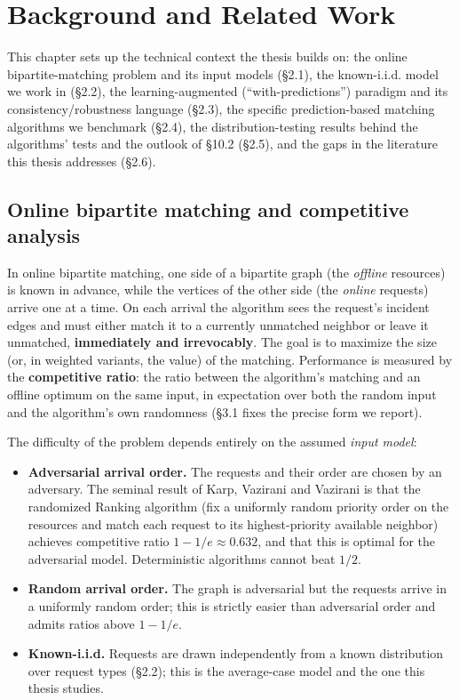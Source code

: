 \chapter{Background and Related Work}

This chapter sets up the technical context the thesis builds on: the
online bipartite-matching problem and its input models (§2.1), the
known-i.i.d. model we work in (§2.2), the learning-augmented
(``with-predictions'') paradigm and its consistency/robustness language
(§2.3), the specific prediction-based matching algorithms we benchmark
(§2.4), the distribution-testing results behind the algorithms' tests
and the outlook of §10.2 (§2.5), and the gaps in the literature this
thesis addresses (§2.6).

\section{Online bipartite matching and competitive
analysis}

In online bipartite matching, one side of a bipartite graph (the
\emph{offline} resources) is known in advance, while the vertices of the
other side (the \emph{online} requests) arrive one at a time. On each
arrival the algorithm sees the request's incident edges and must either
match it to a currently unmatched neighbor or leave it unmatched,
\textbf{immediately and irrevocably}. The goal is to maximize the size
(or, in weighted variants, the value) of the matching. Performance is
measured by the \textbf{competitive ratio}: the ratio between the
algorithm's matching and an offline optimum on the same input, in
expectation over both the random input and the algorithm's own
randomness (§3.1 fixes the precise form we report).

The difficulty of the problem depends entirely on the assumed
\emph{input model}:

\begin{itemize}
\tightlist
\item
  \textbf{Adversarial arrival order.} The requests and their order are
  chosen by an adversary. The seminal result of Karp, Vazirani and
  Vazirani \autocite{kvv1990ranking} is that the randomized Ranking
  algorithm (fix a uniformly random priority order on the resources and
  match each request to its highest-priority available neighbor)
  achieves competitive ratio \(1-1/e\approx0.632\), and that this is
  optimal for the adversarial model. Deterministic algorithms cannot
  beat \(1/2\).
\item
  \textbf{Random arrival order.} The graph is adversarial but the
  requests arrive in a uniformly random order; this is strictly easier
  than adversarial order and admits ratios above \(1-1/e\).
\item
  \textbf{Known-i.i.d.} Requests are drawn independently from a known
  distribution over request types (§2.2); this is the average-case model
  and the one this thesis studies.
\end{itemize}

